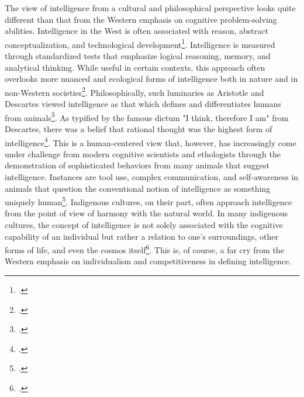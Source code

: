 \documentclass[12pt]{article}
\begin{document}
The view of intelligence from a cultural and philosophical perspective looks quite different than that from the Western emphasis on cognitive problem-solving abilities. Intelligence in the West is often associated with reason, abstract conceptualization, and technological development\footcite{nisbett2003geography}. Intelligence is measured through standardized tests that emphasize logical reasoning, memory, and analytical thinking. While useful in certain contexts, this approach often overlooks more nuanced and ecological forms of intelligence both in nature and in non-Western societies\footcite{sternberg2004wisdom}. Philosophically, such luminaries as Aristotle and Descartes viewed intelligence as that which defines and differentiates humans from animals\footcite{aristotle1986nicomachean}. As typified by the famous dictum "I think, therefore I am" from Descartes, there was a belief that rational thought was the highest form of intelligence\footcite{descartes1996discourse}. This is a human-centered view that, however, has increasingly come under challenge from modern cognitive scientists and ethologists through the demonstration of sophisticated behaviors from many animals that suggest intelligence. Instances are tool use, complex communication, and self-awareness in animals that question the conventional notion of intelligence as something uniquely human\footcite{shettleworth2010cognition}. Indigenous cultures, on their part, often approach intelligence from the point of view of harmony with the natural world. In many indigenous cultures, the concept of intelligence is not solely associated with the cognitive capability of an individual but rather a relation to one's surroundings, other forms of life, and even the cosmos itself\footcite{berkes2012sacred}. This is, of course, a far cry from the Western emphasis on individualism and competitiveness in defining intelligence.
\end{document}
